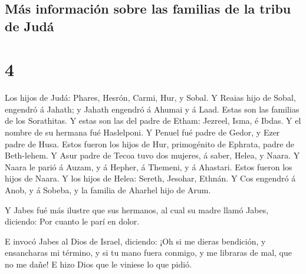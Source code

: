 \hypertarget{muxe1s-informaciuxf3n-sobre-las-familias-de-la-tribu-de-juduxe1}{%
\subsection{Más información sobre las familias de la tribu de
Judá}\label{muxe1s-informaciuxf3n-sobre-las-familias-de-la-tribu-de-juduxe1}}

\hypertarget{section-13-4}{%
\section{4}\label{section-13-4}}

 Los hijos de Judá: Phares, Hesrón, Carmi, Hur, y Sobal.
 Y Reaias hijo de Sobal, engendró á Jahath; y Jahath
engendró á Ahumai y á Laad. Estas son las familias de los Sorathitas.
 Y estas son las del padre de Etham: Jezreel, Isma, é
Ibdas. Y el nombre de su hermana fué Haslelponi.  Y Penuel
fué padre de Gedor, y Ezer padre de Husa. Estos fueron los hijos de Hur,
primogénito de Ephrata, padre de Beth-lehem.  Y Asur padre
de Tecoa tuvo dos mujeres, á saber, Helea, y Naara.  Y
Naara le parió á Auzam, y á Hepher, á Themeni, y á Ahastari. Estos
fueron los hijos de Naara.  Y los hijos de Helea: Sereth,
Jesohar, Ethnán.  Y Cos engendró á Anob, y á Sobeba, y la
familia de Aharhel hijo de Arum.

 Y Jabes fué más ilustre que sus hermanos, al cual su
madre llamó Jabes, diciendo: Por cuanto le parí en dolor.

 E invocó Jabes al Dios de Israel, diciendo: ¡Oh si me
dieras bendición, y ensancharas mi término, y si tu mano fuera conmigo,
y me libraras de mal, que no me dañe! E hizo Dios que le viniese lo que
pidió.

